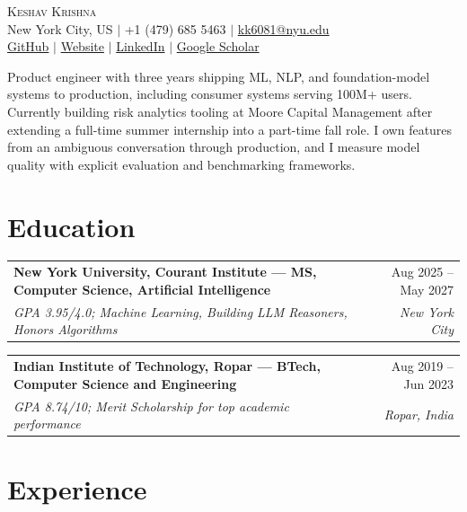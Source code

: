 \documentclass[10pt,letterpaper]{article}
\makeatletter
\newcommand{\entry}[4]{%
  \begin{tabularx}{\textwidth}{@{}Xr@{}}
    \textbf{#1} & #2 \\
    \textit{#3} & \textit{#4}
  \end{tabularx}\vspace{-0.2em}
}
\makeatother
\begin{document}
\fontsize{10.4}{13.2}\selectfont

\begin{center}
  {\fontsize{24}{27}\selectfont\scshape Keshav Krishna}\\[0.15em]
  New York City, US $\mid$ +1 (479) 685 5463 $\mid$ \href{mailto:kk6081@nyu.edu}{kk6081@nyu.edu}\\[-0.05em]
  \href{https://github.com/k-keshav-k}{GitHub} $\mid$
  \href{https://k-keshav-k.github.io/}{Website} $\mid$
  \href{https://www.linkedin.com/in/keshav-krishna-5054681a9/}{LinkedIn} $\mid$
  \href{https://scholar.google.com/citations?user=zN7P_v4AAAAJ}{Google Scholar}
\end{center}

\vspace{0.35em}
Product engineer with three years shipping ML, NLP, and foundation-model systems to production, including consumer systems serving 100M+ users. Currently building risk analytics tooling at Moore Capital Management after extending a full-time summer internship into a part-time fall role. I own features from an ambiguous conversation through production, and I measure model quality with explicit evaluation and benchmarking frameworks.

\section{Education}

\entry{New York University, Courant Institute --- MS, Computer Science, Artificial Intelligence}{Aug 2025 -- May 2027}{GPA 3.95/4.0; Machine Learning, Building LLM Reasoners, Honors Algorithms}{New York City}

\vspace{0.45em}
\entry{Indian Institute of Technology, Ropar --- BTech, Computer Science and Engineering}{Aug 2019 -- Jun 2023}{GPA 8.74/10; Merit Scholarship for top academic performance}{Ropar, India}

\vspace{0.65em}
\section{Experience}
\end{document}
